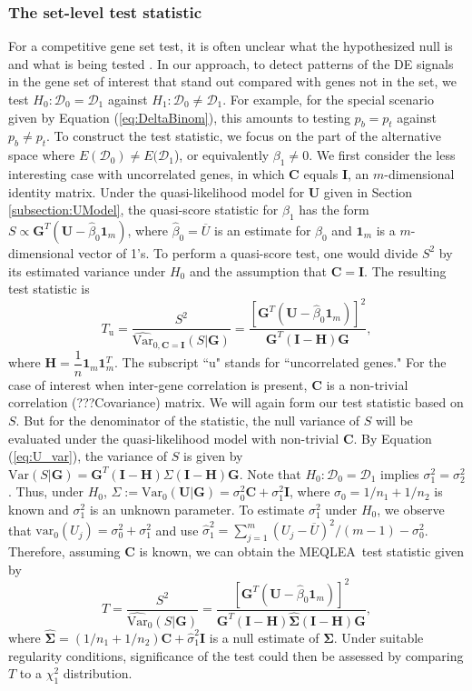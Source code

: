 \documentclass[useAMS,usenatbib, galley]{biom}
\newcommand{\OurMethod}{MEQLEA}
\begin{document}
	\subsubsection{The set-level test statistic}\label{subsection:MEQL}
	For a competitive gene set test, it is often unclear what the hypothesized null is and what is being tested \citep{barry2008statistical,wu2012camera}. In our approach, to detect patterns of the DE signals in the gene set of interest that stand out compared with genes not in the set, we test $H_0: \mathscr{D}_0=\mathscr{D}_1$ against $H_1: \mathscr{D}_0\ne\mathscr{D}_1$. For example, for the special scenario given by Equation (\ref{eq:DeltaBinom}), this amounts to testing $p_{b}=p_{t}$ against $p_{b}\ne p_{t}$.
	To construct the test statistic, we focus on the part of the alternative space where $E(\mathscr{D}_0)\ne E(\mathscr{D}_1$), or equivalently $\beta_1\ne 0$. We first consider the less interesting case with uncorrelated genes, in which $\bm C$ equals $\bm I$, an $m$-dimensional identity matrix. Under the quasi-likelihood model for $\bm U$ given in Section \ref{subsection:UModel},  the quasi-score statistic for $\beta_1$ has the form $S \propto \bm G^T(\bm U-\hat\beta_0\bm 1_m)$, where $\hat\beta_0=\overline{U}$ is an estimate for $\beta_0$ and $\bm 1_m$ is a $m$-dimensional vector of 1's. To perform a quasi-score test, one would divide $S^2$ by its estimated variance under $H_0$ and the assumption that $\bm C=\bm I$. The resulting test statistic is 
	\begin{equation}
		T_{\text{u}} = \dfrac{S^2}{\widehat{\mbox{Var}}_{0, \bm C=\bm I}(S|\bm G)} = \dfrac{[\bm G^T(\bm U-\hat\beta_0\bm 1_m)]^2}{\bm G^T(\bm I-\bm H)\bm G}, 
	\end{equation}
	where $\bm H = \dfrac{1}{n}\bm 1_m\bm 1_m^T$. The subscript ``u" stands for ``uncorrelated genes." For the case of interest when inter-gene correlation is present, $\bm C$ is a non-trivial correlation (???Covariance) matrix. We will again form our test statistic based on $S$. But for the denominator of the statistic, the null variance of $S$ will be evaluated under the quasi-likelihood model with non-trivial $\bm C$. By Equation (\ref{eq:U_var}), the variance of $S$ is given by $\mbox{Var}(S|\bm G) = \bm G^T(\bm I-\bm H)\Sigma(\bm I-\bm H)\bm G$. Note that $H_0: \mathscr{D}_0=\mathscr{D}_1$ implies $\sigma_1^2=\sigma_2^2$. Thus, under $H_0$, $\Sigma:=\mbox{Var}_{0}(\bm U|\bm G)=\sigma_0^2\bm C+\sigma_1^2\bm I$, where $\sigma_0=1/n_1+1/n_2$ is known and $\sigma_1^2$ is an unknown parameter. To estimate $\sigma_1^2$ under $H_0$, we observe that $\mbox{var}_{0}(U_j)=\sigma_0^2+\sigma_1^2$ and use $\hat\sigma_1^2=\sum_{j=1}^m(U_j-\overline{U})^2/(m-1)-\sigma_0^2$. Therefore, assuming $\bm C$ is known, we can obtain the \OurMethod~test statistic given by
	\begin{equation}
		T = \dfrac{S^2}{\widehat{\mbox{Var}}_{0}(S|\bm G)} = \dfrac{[\bm G^T(\bm U-\hat\beta_0\bm 1_m)]^2}{\bm G^T(\bm I-\bm H)\hat{\bm\Sigma}(\bm I-\bm H)\bm G}, 
	\end{equation}
	where $\hat{\bm\Sigma}=(1/n_1+1/n_2)\bm C+\hat\sigma_1^2\bm I$ is a null estimate of $\bm \Sigma$. Under suitable regularity conditions, significance of the test could then be assessed by comparing $T$ to a $\chi^2_1$ distribution.
	
\end{document}
